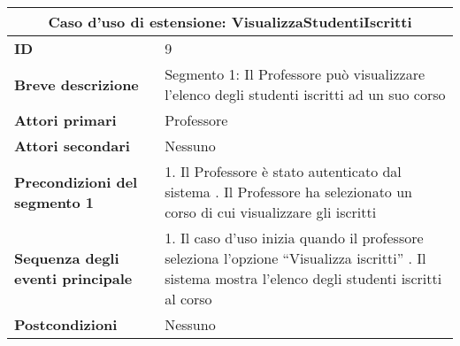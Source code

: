 \documentclass[11pt,a4paper]{report}
\begin{document}
\begin{table}[h!]
\centering
\renewcommand{\arraystretch}{1.3}
\begin{tabular}{|p{4.2cm}|p{10.2cm}|}
\hline
\multicolumn{2}{|c|}{\textbf{Caso d’uso di estensione: VisualizzaStudentiIscritti}} \\ \hline
\textbf{ID} & 9 \\ \hline
\textbf{Breve descrizione} & Segmento 1: Il Professore può visualizzare l’elenco degli studenti iscritti ad un suo corso \\ \hline
\textbf{Attori primari} & Professore \\ \hline
\textbf{Attori secondari} & Nessuno \\ \hline
\textbf{Precondizioni del segmento 1} &
1. Il Professore è stato autenticato dal sistema \newline
2. Il Professore ha selezionato un corso di cui visualizzare gli iscritti \\ \hline
\textbf{Sequenza degli eventi principale} &
1. Il caso d’uso inizia quando il professore seleziona l’opzione “Visualizza iscritti” \newline
2. Il sistema mostra l’elenco degli studenti iscritti al corso \\ \hline
\textbf{Postcondizioni} & Nessuno \\ \hline
\end{tabular}
\end{table}
\newpage

\end{document}
